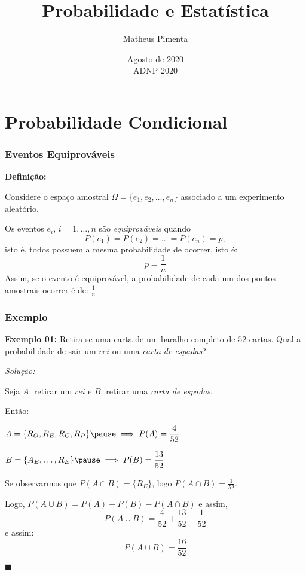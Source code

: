 \documentclass[hyperref={pdfpagelabels=false}]{beamer}
\title{Probabilidade e Estatística}
\author[Matheus Pimenta]{Matheus Pimenta}
\institute[UTFPR-CP]{\normalsize Universidade Tecnológica Federal do Paraná \\
	Câmpus Cornélio Procópio
}
\date{Agosto de 2020 \\ ADNP 2020}
\begin{document}
	
\begin{frame}
\titlepage
\end{frame} 




\section{Probabilidade Condicional} 

\begin{frame}
\frametitle{Eventos Equiprováveis}
{\bf Definição:}

Considere o espaço amostral $\Omega = \{ e_1, e_2, \dots, e_n\}$ associado a um experimento aleatório.

Os eventos $e_i$, $i=1,\dots,n$ são {\it equiprováveis} quando $$P(e_1) = P(e_2) = \dots = P(e_n) = p,$$ isto é, todos possuem a mesma probabilidade de ocorrer, isto é:
$$p = \frac{1}{n}$$
\pause
Assim, se o evento é equiprovável, a probabilidade de cada um dos pontos amostrais ocorrer é de: $\displaystyle\frac{1}{n}$.
\end{frame}

\begin{frame}
\frametitle{Exemplo}
	
{\bf Exemplo 01:} Retira-se uma carta de um baralho completo de $52$ cartas. Qual a probabilidade de sair um $rei$ ou uma {\it carta de espadas}?
\pause 

{\it Solução:}
\pause

Seja $A$: retirar um $rei$ e $B$: retirar uma {\it carta de espadas}.
\pause

Então:

$A = \{ R_O, R_E, R_C, R_P\} \pause \implies P(A) = \displaystyle \frac{4}{52}$

\pause
$B = \{A_E, \dots, R_E\} \pause \implies P(B) = \displaystyle \frac{13}{52}$

\pause
Se observarmos que $P(A \cap B) = \{R_E\}$, logo $P(A \cap B) = \displaystyle \frac{1}{52}$.

\pause
Logo, $P(A \cup B) = P(A) + P(B) - P(A \cap B)$ e assim, 
$$P(A \cup B) = \frac{4}{52} + \frac{13}{52} - \frac{1}{52}$$
e assim:
\pause
$$P(A \cup B) = \frac{16}{52}$$
\begin{flushright}
	$\blacksquare$
\end{flushright}
	
\end{frame}
\end{document}

